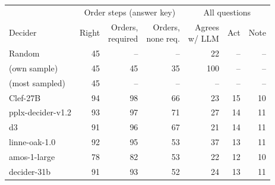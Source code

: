 \begin{tabular}{@{}lrrrrrr@{}}\toprule
& \multicolumn{3}{c}{Order steps (answer key)} & \multicolumn{3}{c}{All questions} \\
\cmidrule(lr){2-4}\cmidrule(l){5-7}
Decider & Right & \shortstack{Orders,\\required} & \shortstack{Orders,\\none req.} & \shortstack{Agrees\\w/ LLM} & Act & Note \\
\midrule
Random & 45 & -- & -- & 22 & -- & -- \\
\llm{} (own sample) & 45 & 45 & 35 & 100 & -- & -- \\
\llm{} (most sampled) & 45 & -- & -- & -- & -- & -- \\
\midrule
Clef-27B & 94 & 98 & 66 & 23 & 15 & 10 \\
pplx-decider-v1.2 & 93 & 97 & 71 & 27 & 14 & 11 \\
d3 & 91 & 96 & 67 & 21 & 14 & 11 \\
linne-oak-1.0 & 92 & 95 & 53 & 37 & 13 & 11 \\
amos-1-large & 78 & 82 & 53 & 22 & 12 & 10 \\
decider-31b & 91 & 93 & 52 & 24 & 13 & 11 \\
\bottomrule\end{tabular}
